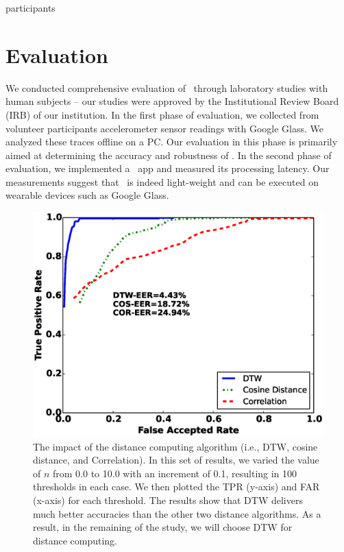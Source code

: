 participants\section{Evaluation}\label{sec:results}

We conducted comprehensive evaluation of \systemname~through laboratory studies with
human subjects -- our studies were approved by the Institutional Review Board (IRB) of our
institution. In the first phase of evaluation, we collected from volunteer participants accelerometer sensor
readings with Google Glass. We analyzed these traces offline on a PC.
Our evaluation in this phase is primarily aimed at determining the accuracy and robustness of \systemname.
In the second phase of evaluation, we implemented a \systemname~app and measured its processing latency. Our measurements suggest that \systemname~is indeed light-weight and can be executed on wearable devices such as Google Glass.


\begin{figure}\centering
\includegraphics[width=.85\columnwidth]{figure/roc_dtw_cos_cor.eps}
\caption{\label{fig:roc_dtw_cos_cor} The impact of the distance computing algorithm (i.e., DTW, cosine distance, and Correlation). In this set of results, we varied the value of $n$ from 0.0 to 10.0 with an increment of 0.1, resulting in 100 thresholds in each case. We then plotted the TPR (y-axis) and FAR (x-axis) for each threshold. The results show that DTW delivers much better accuracies than the other two distance algorithms. As a result, in the remaining of the study, we will choose DTW for distance computing.}
\end{figure}

